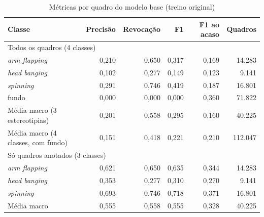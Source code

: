 
\begin{table}[htbp]
\centering
\small
\caption{Métricas por quadro do modelo base (treino original)}
\label{tab:quadro-base}
\begin{tabular}{lrrrrr}
\toprule
Classe & Precisão & Revocação & F1 & F1 ao acaso & Quadros \\
\midrule
\multicolumn{6}{l}{Todos os quadros (4 classes)} \\
\textit{arm flapping} & 0,210 & 0,650 & 0,317 & 0,169 & 14.283 \\
\textit{head banging} & 0,102 & 0,277 & 0,149 & 0,123 & 9.141 \\
\textit{spinning} & 0,291 & 0,746 & 0,419 & 0,187 & 16.801 \\
fundo & 0,000 & 0,000 & 0,000 & 0,360 & 71.822 \\
Média macro (3 estereotipias) & 0,201 & 0,558 & 0,295 & 0,160 & 40.225 \\
Média macro (4 classes, com fundo) & 0,151 & 0,418 & 0,221 & 0,210 & 112.047 \\
\midrule
\multicolumn{6}{l}{Só quadros anotados (3 classes)} \\
\textit{arm flapping} & 0,621 & 0,650 & 0,635 & 0,344 & 14.283 \\
\textit{head banging} & 0,353 & 0,277 & 0,310 & 0,270 & 9.141 \\
\textit{spinning} & 0,693 & 0,746 & 0,718 & 0,371 & 16.801 \\
Média macro & 0,555 & 0,558 & 0,555 & 0,328 & 40.225 \\
\bottomrule
\end{tabular}
\end{table}
